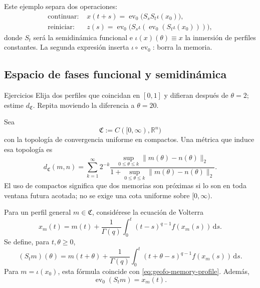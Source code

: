 Este ejemplo separa dos operaciones:
\begin{align}
 \text{continuar: }&x(t+s)=
 \operatorname{ev}_0\bigl(S_sS_t\iota(x_0)\bigr),
 \label{eq:geofo-continue-operation}\\
 \text{reiniciar: }&z(s)=
 \operatorname{ev}_0\bigl(S_s\iota(
 \operatorname{ev}_0(S_t\iota(x_0)))\bigr),
 \label{eq:geofo-reset-operation}
\end{align}
donde \(S_t\) será la semidinámica funcional e
\(\iota(x)(\theta)\equiv x\) la inmersión de perfiles constantes. La segunda
expresión inserta \(\iota\circ\operatorname{ev}_0\): borra la memoria.

\subsection{Espacio de fases funcional y semidinámica}

\ifHAFOPedagogy
\begin{bloqueestudio}{Ejercicios}
Elija dos perfiles que coincidan en \([0,1]\) y difieran después de
\(\theta=2\); estime \(d_{\mathfrak C}\). Repita moviendo la diferencia a
\(\theta=20\).
\end{bloqueestudio}
\fi

Sea
\begin{equation}
 \mathfrak C:=C([0,\infty),\mathbb R^n)
 \label{eq:geofo-history-space}
\end{equation}
con la topología de convergencia uniforme en compactos. Una métrica que induce
esa topología es
\begin{equation}
 d_{\mathfrak C}(m,n)=
 \sum_{k=1}^{\infty}2^{-k}
 \frac{\displaystyle\sup_{0\leq\theta\leq k}
 \|m(\theta)-n(\theta)\|_2}
 {1+\displaystyle\sup_{0\leq\theta\leq k}
 \|m(\theta)-n(\theta)\|_2}.
 \label{eq:geofo-compact-open-metric}
\end{equation}
El uso de compactos significa que dos memorias son próximas si lo son en toda
ventana futura acotada; no se exige una cota uniforme sobre
\([0,\infty)\).

Para un perfil general \(m\in\mathfrak C\), considérese la ecuación de Volterra
\begin{equation}
 x_m(t)=m(t)+\frac1{\Gamma(q)}
 \int_0^t(t-s)^{q-1}f(x_m(s))\,\mathrm ds.
 \label{eq:geofo-general-volterra}
\end{equation}
Se define, para \(t,\theta\geq0\),
\begin{equation}
 (S_tm)(\theta)=m(t+\theta)+\frac1{\Gamma(q)}
 \int_0^t(t+\theta-s)^{q-1}f(x_m(s))\,\mathrm ds.
 \label{eq:geofo-semiflow-operator}
\end{equation}
Para \(m=\iota(x_0)\), esta fórmula coincide con
\cref{eq:geofo-memory-profile}. Además,
\begin{equation}
 \operatorname{ev}_0(S_tm)=x_m(t).
 \label{eq:geofo-evaluation-semiflow}
\end{equation}


